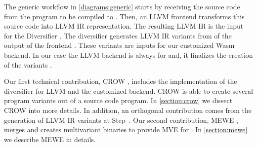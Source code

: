 The generic workflow in \autoref{diagrams:generic} starts by receiving the source code from the program to be compiled to \wasm. Then, an LLVM frontend transforms this source code into LLVM IR representation. The resulting LLVM IR is the input for the Diversifier .  
The diversifier generates LLVM IR variants from of the output of the frontend . These variants are inputs for our customized Wasm  backend. In our case the LLVM backend is always for \wasm and, it finalizes the creation of the variants . 

Our first technical contribution, CROW  \cite{CROW}, includes the implementation of the diversifier for LLVM and the customized \wasm backend. CROW is able to create several \wasm program variants out of a source code program. In \autoref{section:crow} we dissect CROW into more details.
In addition, an orthogonal contribution comes from the generation of LLVM IR variants at Step~. Our second contribution, MEWE  \cite{MEWE}, merges and creates multivariant binaries to provide MVE for \wasm {}. In \autoref{section:mewe} we describe MEWE in details.

